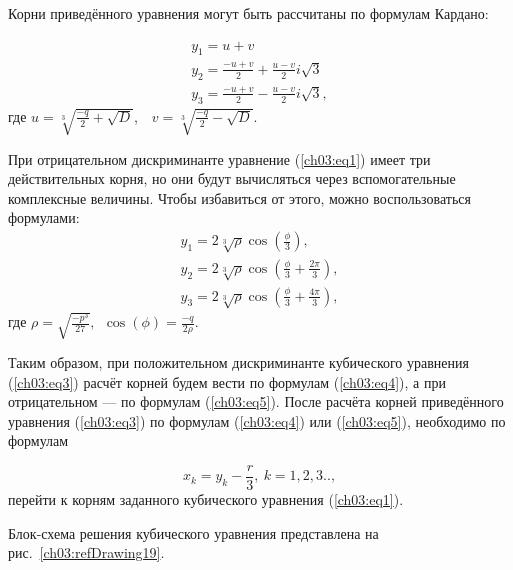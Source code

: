 Корни приведённого уравнения могут быть рассчитаны по формулам Кардано:

\begin{equation}\label{ch03:eq4}
\begin{array}{l}
y_1=u+v\\
y_2=\frac{-{u+v}}{2}+\frac{u-v}{2}i\sqrt{3}\\
y_3=\frac{-{u+v}}{2}-\frac{u-v}{2}i\sqrt{3},
\end{array}
\end{equation}
где $u=\sqrt[{3}]{\frac{-q}{2}+\sqrt{D}}$,\ \  $v=\sqrt[{3}]{\frac{-q}{2}-\sqrt{D}}$.

При отрицательном дискриминанте уравнение (\ref{ch03:eq1}) имеет три действительных корня, но они будут вычисляться
через вспомогательные комплексные величины. Чтобы избавиться от этого, можно воспользоваться формулами:
\begin{equation}\label{ch03:eq5}
\begin{array}{l}
y_1=2\sqrt[{3}]{\rho}\cos(\frac{\phi}{3}),\\
y_2=2\sqrt[{3}]{\rho}\cos(\frac{\phi}{3}+\frac{2\pi}{3}),\\
y_3=2\sqrt[{3}]{\rho}\cos(\frac{\phi}{3}+\frac{4\pi}{3}),
\end{array}
\end{equation}
где $\rho =\sqrt{\frac{-{p^{3}}}{27}},\ \ \cos(\phi )=\frac{-{q}}{2\rho}$.

Таким образом, при положительном дискриминанте кубического уравнения (\ref{ch03:eq3}) расчёт корней будем вести по
формулам (\ref{ch03:eq4}), а при отрицательном --- по формулам (\ref{ch03:eq5}). После расчёта корней приведённого
уравнения (\ref{ch03:eq3}) по формулам (\ref{ch03:eq4}) или (\ref{ch03:eq5}), необходимо по формулам 

\begin{equation*}
x_{k}=y_{k}-\frac{r}{3},\ k=1,2,3..,
\end{equation*}
перейти к корням заданного кубического уравнения (\ref{ch03:eq1}).

Блок-схема решения кубического уравнения представлена на рис.~\ref{ch03:refDrawing19}.

